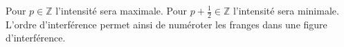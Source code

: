 ﻿\documentclass[a4paper]{article}
\begin{document}
\pagestyle{fancy}
\fancyhf{}
\setlength{\headheight}{15pt}

\begin{center}
	\large{}
\end{center}


\par

Pour \( p \in \mathbb{Z} \) l'intensité sera maximale. Pour \( p + \frac{1}{2} \in \mathbb{Z} \) l'intensité sera minimale.\\
L'ordre d'interférence permet ainsi de numéroter les franges dans une figure d'interférence.
\end{document}
